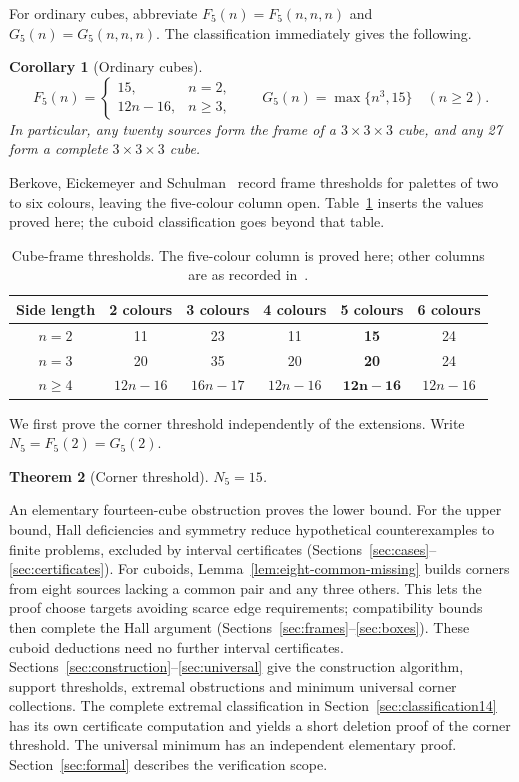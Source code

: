 \documentclass[11pt]{article}
\newtheorem{theorem}{Theorem}
\newtheorem{corollary}[theorem]{Corollary}
\theoremstyle{remark}
\begin{document}
For ordinary cubes, abbreviate $F_5(n)=F_5(n,n,n)$ and
$G_5(n)=G_5(n,n,n)$. The classification immediately gives the following.
\begin{corollary}[Ordinary cubes]\label{thm:frames}\label{thm:complete}
\[
 F_5(n)=\begin{cases}15,&n=2,\\12n-16,&n\ge3,\end{cases}
 \qquad G_5(n)=\max\{n^3,15\}\quad(n\ge2).
\]
In particular, any twenty sources form the frame of a $3\times3\times3$ cube, and any 27 form a
complete $3\times3\times3$ cube.
\end{corollary}

Berkove, Eickemeyer and Schulman~\cite[Section 8, Table 7]{BES} record
frame thresholds for palettes of two to six colours, leaving the
five-colour column open. Table~\ref{tab:palette-thresholds} inserts the
values proved here; the cuboid classification goes beyond that table.
\begin{table}[ht]
\centering
\small
\begin{tabular}{c c c c c c}
\toprule
Side length & 2 colours & 3 colours & 4 colours & \textbf{5 colours} & 6 colours\\
\midrule
$n=2$ & 11 & 23 & 11 & \textbf{15} & 24\\
$n=3$ & 20 & 35 & 20 & \textbf{20} & 24\\
$n\ge4$ & $12n-16$ & $16n-17$ & $12n-16$ & $\boldsymbol{12n-16}$ & $12n-16$\\
\bottomrule
\end{tabular}
\caption{Cube-frame thresholds. The five-colour column is proved here;
other columns are as recorded in~\cite[Table 7]{BES}.}
\label{tab:palette-thresholds}
\end{table}

We first prove the corner threshold independently of the extensions.
Write $N_5=F_5(2)=G_5(2)$.
\begin{theorem}[Corner threshold]\label{thm:main}
$N_5=15$.
\end{theorem}
An elementary fourteen-cube obstruction proves the lower bound.
For the upper bound, Hall deficiencies and symmetry reduce hypothetical
counterexamples to finite problems, excluded by interval certificates
(Sections~\ref{sec:cases}--\ref{sec:certificates}).
For cuboids, Lemma~\ref{lem:eight-common-missing} builds corners from eight
sources lacking a common pair and any three others. This lets the proof
choose targets avoiding scarce edge requirements; compatibility bounds then
complete the Hall argument (Sections~\ref{sec:frames}--\ref{sec:boxes}).
These cuboid deductions need no further interval certificates.
Sections~\ref{sec:construction}--\ref{sec:universal} give the construction
algorithm, support thresholds, extremal obstructions and minimum universal
corner collections. The complete extremal classification in
Section~\ref{sec:classification14} has its own certificate computation and
yields a short deletion proof of the corner threshold. The universal minimum
has an independent elementary proof. Section~\ref{sec:formal} describes the
verification scope.
\end{document}
